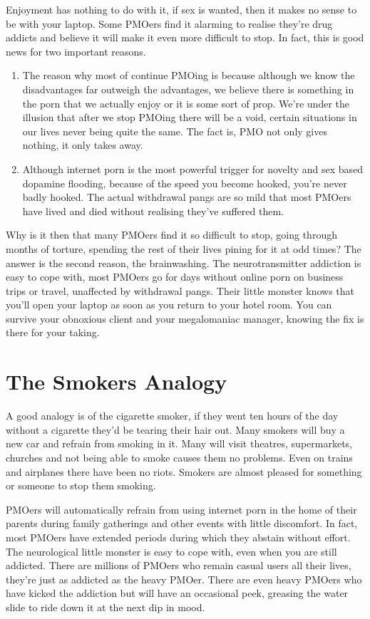 \documentclass[easypeasy.tex]{subfiles}
\begin{document}
Enjoyment has nothing to do with it, if sex is wanted, then it makes no sense to be with your laptop. Some PMOers find it alarming to realise they're drug addicts and believe it will make it even more difficult to stop. In fact, this is good news for two important reasons.
    \begin{enumerate}
      \item The reason why most of continue PMOing is because although we know the disadvantages far outweigh the advantages, we believe there is something in the porn that we actually enjoy or it is some sort of prop. We're under the illusion that after we stop PMOing there will be a void, certain situations in our lives never being quite the same. The fact is, PMO not only gives nothing, it only takes away.

      \item Although internet porn is the most powerful trigger for novelty and sex based dopamine flooding, because of the speed you become hooked, you're never badly hooked. The actual withdrawal pangs are so mild that most PMOers have lived and died without realising they've suffered them.
    \end{enumerate}

Why is it then that many PMOers find it so difficult to stop, going through months of torture, spending the rest of their lives pining for it at odd times? The answer is the second reason, the brainwashing. The neurotransmitter addiction is easy to cope with, most PMOers go for days without online porn on business trips or travel, unaffected by withdrawal pangs. Their little monster knows that you'll open your laptop as soon as you return to your hotel room. You can survive your obnoxious client and your megalomaniac manager, knowing the fix is there for your taking.

\section{The Smokers Analogy}
A good analogy is of the cigarette smoker, if they went ten hours of the day without a cigarette they'd be tearing their hair out. Many smokers will buy a new car and refrain from smoking in it. Many will visit theatres, supermarkets, churches and not being able to smoke causes them no problems. Even on trains and airplanes there have been no riots. Smokers are almost pleased for something or someone to stop them smoking.

PMOers will automatically refrain from using internet porn in the home of their parents during family gatherings and other events with little discomfort. In fact, most PMOers have extended periods during which they abstain without effort. The neurological little monster is easy to cope with, even when you are still addicted. There are millions of PMOers who remain casual users all their lives, they're just as addicted as the heavy PMOer. There are even heavy PMOers who have kicked the addiction but will have an occasional peek, greasing the water slide to ride down it at the next dip in mood.
\end{document}
